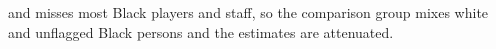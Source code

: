 \begin{table}[!h]
{\begin{threeparttable}
\begin{tablenotes}[para]
and misses most Black players and staff, so the comparison group mixes white and unflagged Black persons and the estimates are attenuated.
\end{tablenotes}
\end{threeparttable}}
\end{table}
